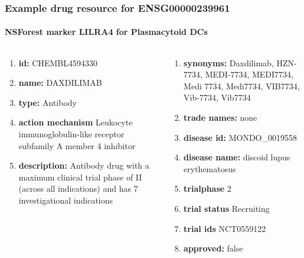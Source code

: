 \documentclass[aspectratio=169,xcolor=dvipsnames]{beamer}
\begin{document}
\begin{frame}
  \frametitle{Example \textbf{drug} resource for ENSG00000239961}
  \framesubtitle{NSForest marker LILRA4 for Plasmacytoid DCs}
  \begin{columns}[t]\footnotesize
    \begin{column}{0.5\textwidth}
      \begin{enumerate}
      \item[]\textbf{id:} CHEMBL4594330
      \item[]\textbf{name:} DAXDILIMAB
      \item[]\textbf{type:} Antibody
      \item[] \textbf{action mechanism} Leukocyte immunoglobulin-like
        receptor subfamily A member 4 inhibitor
      \item[]\textbf{description:} Antibody drug with a maximum clinical
        trial phase of II (across all indications) and has 7
        investigational indications
      \end{enumerate}
    \end{column}
    \begin{column}{0.5\textwidth}
      \begin{enumerate}
      \item[]\textbf{synonyms:} Daxdilimab, HZN-7734, MEDI-7734, MEDI7734,
        Medi 7734, Medi7734, VIB7734, Vib-7734, Vib7734
      \item[]\textbf{trade names:} none
      \item[]\textbf{disease id:} MONDO\_0019558
      \item[]\textbf{disease name:} discoid lupus erythematosus
      \item[]\textbf{trialphase} 2
      \item[]\textbf{trial status} Recruiting
      \item[]\textbf{trial ids} NCT0559122
      \item[]\textbf{approved:} false
      \end{enumerate}
    \end{column}
  \end{columns}
\end{frame}
\end{document}
